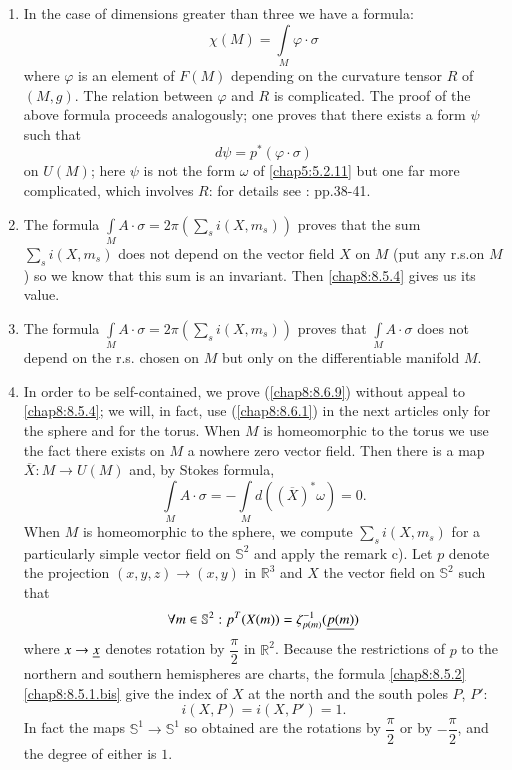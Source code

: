 \begin{remarks*}
\begin{enumerate}
\renewcommand{\theenumi}{\alph{enumi}}
\renewcommand{\labelenumi}{\theenumi)}
\item In the case of dimensions greater than three we have a formula:
$$
\chi(M)=\int\limits_{M}\varphi\cdot\sigma
$$
where $\varphi$ is an element of $F(M)$ depending on the curvature
tensor $R$ of $(M,g)$. The relation between $\varphi$ and $R$ is
complicated. The proof of the above formula proceeds analogously; one
proves that there exists a form $\psi$ such that 
$$
d\psi=p^{\ast}(\varphi\cdot \sigma)
$$
on $U(M)$; here $\psi$ is not the form $\omega$ of \eqref{chap5:5.2.11} but
one far more complicated, which involves $R$: for details see
\cite{9}: pp.\@ 38-41.

\item The formula $\int\limits_{M}A\cdot
  \sigma=2\pi(\sum\limits_{s}i(X,m_{s}))$ proves that the sum\break
   $\sum\limits_{s} i(X,m_{s})$ does not depend on the vector field $X$
  on $M$ (put any r.s.\@ on $M$) so we know that this sum is an
  invariant. Then \eqref{chap8:8.5.4} gives us its value.

\item The \pageoriginale formula
  $\int\limits_{M}A\cdot\sigma=2\pi(\sum\limits_{s}i(X,m_{s}))$ proves
  that $\int\limits_{M}A\cdot\sigma$ does not depend on the r.s.\@
  chosen on $M$ but only on the differentiable manifold $M$.

\item In order to be self-contained, we prove (\ref{chap8:8.6.9})
  without appeal to \eqref{chap8:8.5.4}; we will, in fact, use
  (\ref{chap8:8.6.1}) in the next articles only for the sphere and for
  the torus. When $M$ is homeomorphic to the torus we use the fact
  there exists on $M$ a nowhere zero vector field. Then there is a map
  $\overline{X}:M\to U(M)$ and, by Stokes formula,
$$
\int\limits_{M}A\cdot\sigma=-\int\limits_{M}d((\overline{X})^{\ast}\omega)=0.
$$
When $M$ is homeomorphic to the sphere, we compute
$\sum\limits_{s}i(X,m_{s})$ for a particularly simple vector field on
$\mathbb{S}^{2}$ and apply the remark c). Let $p$ denote the
projection $(x,y,z)\to (x,y)$ in $\mathbb{R}^{3}$ and $X$ the vector
field on $\mathbb{S}^{2}$ such that
$$
\forall m\in \mathbb{S}^{2}:p^{T}(X(m))=\zeta^{-1}_{p(m)}(\underline{p(m)})
$$
where $x\to \underline{x}$ denotes rotation by $\dfrac{\pi}{2}$ in
$\mathbb{R}^{2}$. Because the restrictions of $p$ to the northern and
southern hemispheres are charts, the formula \eqref{chap8:8.5.2}
\eqref{chap8:8.5.1.bis} give the index of $X$ at the north and the south
poles $P$, $P'$:
$$
i(X,P)=i(X,P')=1.
$$
In fact the maps $\mathbb{S}^{1}\to \mathbb{S}^{1}$ so obtained are
the rotations by $\dfrac{\pi}{2}$ or by $-\dfrac{\pi}{2}$, and the
degree of either is $1$.
\end{enumerate}
\end{remarks*}

